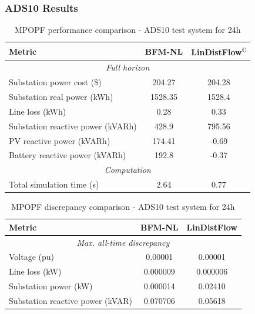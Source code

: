 \subsubsection{ADS10 Results}

\begin{table}[H]
    \centering
    \caption{MPOPF performance comparison - ADS10 test system for 24h}
    \label{table:mpopf-tradeoffs-opt-ads10}
    \begin{tabular}{|l|c|c|}
    \hline
    \textbf{Metric} & \textbf{BFM-NL} & \textbf{LinDistFlow\textsuperscript{\(\mathbb{O}\)}} \\ \hline
    \multicolumn{3}{|c|}{\textit{Full horizon}} \\ \hline
    Substation power cost (\$) & 204.27 & 204.28 \\ \hline
    Substation real power (kWh) & 1528.35 & 1528.4 \\ \hline
    Line loss (kWh) & 0.28 & 0.33 \\ \hline
    Substation reactive power (kVARh) & 428.9 & 795.56 \\ \hline
    PV reactive power (kVARh) & 174.41 & -0.69 \\ \hline
    Battery reactive power (kVARh) & 192.8 & -0.37 \\ \hline
    \multicolumn{3}{|c|}{\textit{Computation}} \\ \hline
    Total simulation time (s) & 2.64 & 0.77 \\ \hline
    \end{tabular}
\end{table}

\begin{table}[H]
    \centering
    \caption{MPOPF discrepancy comparison - ADS10 test system for 24h}
    \label{table:mpopf-tradeoffs-feas-ads10}
    \begin{tabular}{|l|c|c|}
    \hline
    \textbf{Metric} & \textbf{BFM-NL} & \textbf{LinDistFlow} \\ \hline
    \multicolumn{3}{|c|}{\textit{Max. all-time discrepancy}} \\ \hline
    Voltage (pu) & 0.00001 & 0.00001 \\ \hline
    Line loss (kW) & 0.000009 & 0.000006 \\ \hline
    Substation power (kW) & 0.000014 & 0.02410 \\ \hline
    Substation reactive power (kVAR) & 0.070706 & 0.05618 \\ \hline
    \end{tabular}
\end{table}

